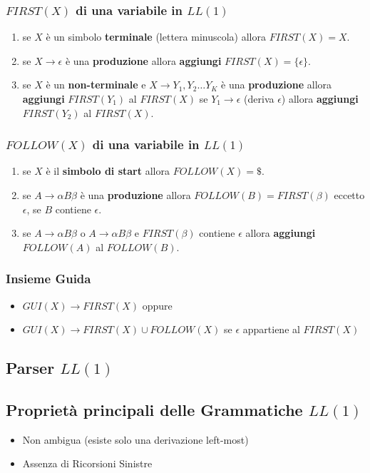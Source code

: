 \documentclass[12pt]{extarticle}
\begin{document}
\subsubsection{$FIRST(X)$ di una variabile in $LL(1)$}
\begin{enumerate}
    \item se $X$ è un simbolo \textbf{terminale} (lettera minuscola) allora $FIRST(X)=X$.
    \item se $X \rightarrow \epsilon$ è una \textbf{produzione} allora \textbf{aggiungi} $FIRST(X)=\{\epsilon\}$.
    \item se $X$ è un \textbf{non-terminale} e $X \rightarrow Y_1,Y_2\dots Y_K$ è una \textbf{produzione} allora \textbf{aggiungi} $FIRST(Y_1)$ al $FIRST(X)$
            se $Y_1 \rightarrow \epsilon$ (deriva $\epsilon$) allora \textbf{aggiungi} $FIRST(Y_2)$ al $FIRST(X)$.
\end{enumerate}

\subsubsection{$FOLLOW(X)$ di una variabile in $LL(1)$}
\begin{enumerate}
    \item se $X$ è il \textbf{simbolo di start} allora $FOLLOW(X)=\$$.
    \item se $A \rightarrow \alpha B \beta$ è una \textbf{produzione} allora $FOLLOW(B)=FIRST(\beta)$ eccetto $\epsilon$, se $B$ contiene $\epsilon$.
    \item se $A \rightarrow \alpha B \beta$ o $A \rightarrow \alpha B \beta$ e $FIRST(\beta)$ contiene $\epsilon$ allora \textbf{aggiungi} $FOLLOW(A)$ al $FOLLOW(B)$.
\end{enumerate}

\subsubsection{Insieme Guida}
\begin{itemize}
    \item $GUI(X) \rightarrow FIRST(X)$ oppure
    \item $GUI(X) \rightarrow FIRST(X)\cup FOLLOW(X)$ se $\epsilon$ appartiene al $FIRST(X)$
\end{itemize}

\subsection{Parser $LL(1)$}
\subsection{Proprietà principali delle Grammatiche $LL(1)$}
\begin{itemize}
    \item Non ambigua (esiste solo una derivazione left-most)
    \item Assenza di Ricorsioni Sinistre
\end{itemize}
\end{document}
